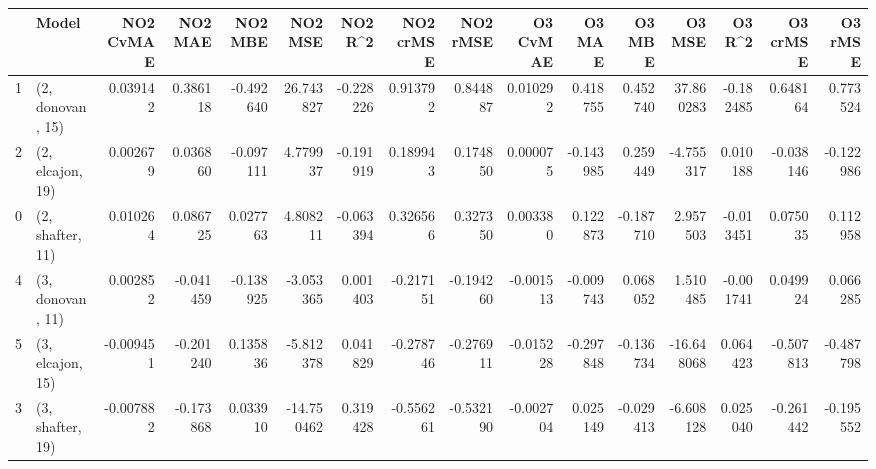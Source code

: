 \begin{tabular}{llrrrrrrrrrrrrrr}
\toprule
{} &             Model &  NO2 CvMAE &   NO2 MAE &   NO2 MBE &    NO2 MSE &   NO2 R\textasciicircum2 &  NO2 crMSE &  NO2 rMSE &  O3 CvMAE &    O3 MAE &    O3 MBE &     O3 MSE &    O3 R\textasciicircum2 &  O3 crMSE &   O3 rMSE \\
\midrule
1 &  (2, donovan, 15) &   0.039142 &  0.386118 & -0.492640 &  26.743827 & -0.228226 &   0.913792 &  0.844887 &  0.010292 &  0.418755 &  0.452740 &  37.860283 & -0.182485 &  0.648164 &  0.773524 \\
2 &  (2, elcajon, 19) &   0.002679 &  0.036860 & -0.097111 &   4.779937 & -0.191919 &   0.189943 &  0.174850 &  0.000075 & -0.143985 &  0.259449 &  -4.755317 &  0.010188 & -0.038146 & -0.122986 \\
0 &  (2, shafter, 11) &   0.010264 &  0.086725 &  0.027763 &   4.808211 & -0.063394 &   0.326566 &  0.327350 &  0.003380 &  0.122873 & -0.187710 &   2.957503 & -0.013451 &  0.075035 &  0.112958 \\
4 &  (3, donovan, 11) &   0.002852 & -0.041459 & -0.138925 &  -3.053365 &  0.001403 &  -0.217151 & -0.194260 & -0.001513 & -0.009743 &  0.068052 &   1.510485 & -0.001741 &  0.049924 &  0.066285 \\
5 &  (3, elcajon, 15) &  -0.009451 & -0.201240 &  0.135836 &  -5.812378 &  0.041829 &  -0.278746 & -0.276911 & -0.015228 & -0.297848 & -0.136734 & -16.648068 &  0.064423 & -0.507813 & -0.487798 \\
3 &  (3, shafter, 19) &  -0.007882 & -0.173868 &  0.033910 & -14.750462 &  0.319428 &  -0.556261 & -0.532190 & -0.002704 &  0.025149 & -0.029413 &  -6.608128 &  0.025040 & -0.261442 & -0.195552 \\
\bottomrule
\end{tabular}
